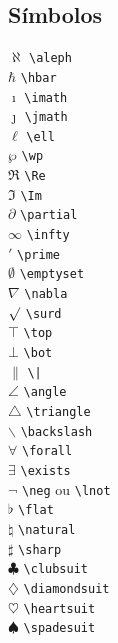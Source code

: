 \documentclass[xindy,rascunho]{fei}
\begin{document}
\begin{teorema}
\section{Símbolos}
\begin{multicols}{3}
\noindent
\(\aleph\) \verb+\aleph+\\
\(\hbar\) \verb+\hbar+\\
\(\imath\) \verb+\imath+\\
\(\jmath\) \verb+\jmath+\\
\(\ell\) \verb+\ell+\\
\(\wp\) \verb+\wp+\\
\(\Re\) \verb+\Re+\\
\(\Im\) \verb+\Im+\\
\(\partial\) \verb+\partial+\\
\(\infty\) \verb+\infty+\\
\(\prime\) \verb+\prime+\\
\(\emptyset\) \verb+\emptyset+\\
\(\nabla\) \verb+\nabla+\\
\(\surd\) \verb+\surd+\\
\(\top\) \verb+\top+\\
\(\bot\) \verb+\bot+\\
\(\|\) \verb+\|+\\
\(\angle\) \verb+\angle+\\
\(\triangle\) \verb+\triangle+\\
\(\backslash\) \verb+\backslash+\\
\(\forall\) \verb+\forall+\\
\(\exists\) \verb+\exists+\\
\(\lnot\) \verb+\neg+ ou \verb+\lnot+\\
\(\flat\) \verb+\flat+\\
\(\natural\) \verb+\natural+\\
\(\sharp\) \verb+\sharp+\\
\(\clubsuit\) \verb+\clubsuit+\\
\(\diamondsuit\) \verb+\diamondsuit+\\
\(\heartsuit\) \verb+\heartsuit+\\
\(\spadesuit\) \verb+\spadesuit+\\
\end{multicols}


\end{teorema}
\end{document}
